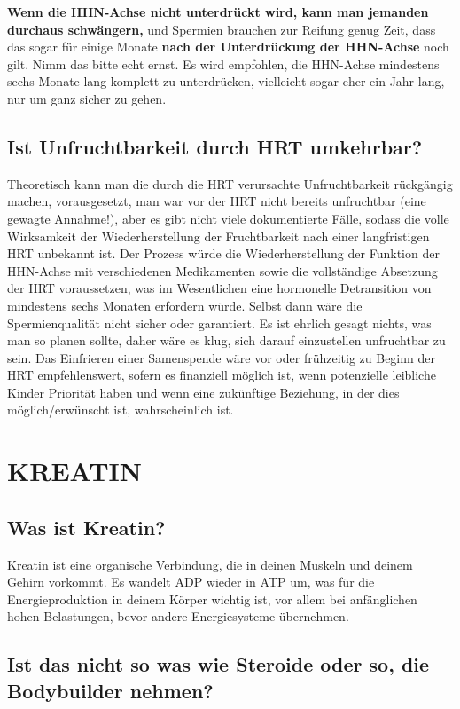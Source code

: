 \documentclass{article}
\begin{document}
\textbf{Wenn die HHN-Achse nicht unterdrückt wird, kann man jemanden durchaus schwängern,} und Spermien brauchen zur Reifung genug Zeit, dass das sogar für einige Monate \textbf{nach der Unterdrückung der HHN-Achse} noch gilt. Nimm das bitte echt ernst. Es wird empfohlen, die HHN-Achse mindestens sechs Monate lang komplett zu unterdrücken, vielleicht sogar eher ein Jahr lang, nur um ganz sicher zu gehen.  

\subsection{Ist Unfruchtbarkeit durch HRT umkehrbar?}\label{11-43}

Theoretisch kann man die durch die HRT verursachte Unfruchtbarkeit rückgängig machen, vorausgesetzt, man war vor der HRT nicht bereits unfruchtbar (eine gewagte Annahme!), aber es gibt nicht viele dokumentierte Fälle, sodass die volle Wirksamkeit der Wiederherstellung der Fruchtbarkeit nach einer langfristigen HRT unbekannt ist. Der Prozess würde die Wiederherstellung der Funktion der HHN-Achse mit verschiedenen Medikamenten sowie die vollständige Absetzung der HRT voraussetzen, was im Wesentlichen eine hormonelle Detransition von mindestens sechs Monaten erfordern würde. Selbst dann wäre die Spermienqualität nicht sicher oder garantiert. Es ist ehrlich gesagt nichts, was man so planen sollte, daher wäre es klug, sich darauf einzustellen unfruchtbar zu sein. Das Einfrieren einer Samenspende wäre vor oder frühzeitig zu Beginn der HRT empfehlenswert, sofern es finanziell möglich ist, wenn potenzielle leibliche Kinder Priorität haben und wenn eine zukünftige Beziehung, in der dies möglich/erwünscht ist, wahrscheinlich ist.



\section{KREATIN}

\subsection{Was ist Kreatin?}

Kreatin ist eine organische Verbindung, die in deinen Muskeln und deinem Gehirn vorkommt. Es wandelt ADP wieder in ATP um, was für die Energieproduktion in deinem Körper wichtig ist, vor allem bei anfänglichen hohen Belastungen, bevor andere Energiesysteme übernehmen.

\subsection{Ist das nicht so was wie Steroide oder so, die Bodybuilder nehmen?}
\end{document}
